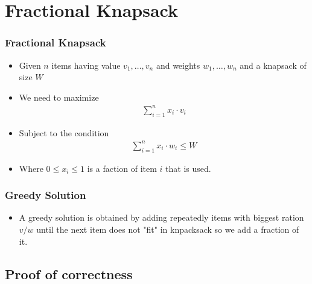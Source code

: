\documentclass{beamer}
\begin{document}
\section{Fractional Knapsack}
\begin{frame}
  \frametitle{Fractional Knapsack}
  \begin{itemize}
  \item Given $n$ items having value $v_1,\ldots,v_n$ and weights $w_1,\ldots,w_n$ and a knapsack of size $W$
  \item We need to maximize
    \begin{align*}
      \sum_{i=1}^nx_i\cdot v_i
    \end{align*}
\item Subject to the condition
  \begin{align*}
    \sum_{i=1}^nx_i\cdot w_i\le W
  \end{align*}
\item Where $0\le x_i\le 1$ is a faction of item $i$ that is used.
  \end{itemize}
\end{frame}
\begin{frame}
  \frametitle{Greedy Solution}
  \begin{itemize}
  \item A greedy solution is obtained by adding repeatedly items with biggest ration $v/w$ until the next item does not "fit" in knpacksack so we add a fraction of it.
  \end{itemize}

\end{frame}
\subsection{Proof of correctness}
\end{document}
